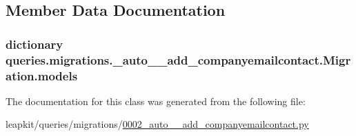 \subsection{Member Data Documentation}
\hypertarget{classqueries_1_1migrations_1_10002__auto____add__companyemailcontact_1_1_migration_a15d43e59a4b3243f164bf5fd78735146}{
\subsubsection[{models}]{\setlength{\rightskip}{0pt plus 5cm}dictionary queries.\-migrations.\-\_\-auto\-\_\-\-\_\-add\-\_\-companyemailcontact.\-Migration.\-models\hspace{0.3cm}{\ttfamily [static]}}}\label{classqueries_1_1migrations_1_10002__auto____add__companyemailcontact_1_1_migration_a15d43e59a4b3243f164bf5fd78735146}


The documentation for this class was generated from the following file\-:\begin{DoxyCompactItemize}
\item 
leapkit/queries/migrations/\hyperlink{0002__auto____add__companyemailcontact_8py}{0002\-\_\-auto\-\_\-\-\_\-add\-\_\-companyemailcontact.\-py}\end{DoxyCompactItemize}

